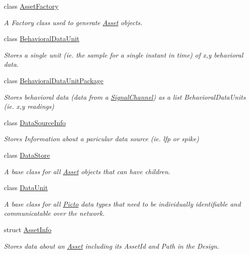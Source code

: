 \begin{DoxyCompactItemize}
class \hyperlink{class_picto_1_1_asset_factory}{Asset\-Factory}
\begin{DoxyCompactList}\small\item\em A Factory class used to generate \hyperlink{class_picto_1_1_asset}{Asset} objects. \end{DoxyCompactList}\item 
class \hyperlink{class_picto_1_1_behavioral_data_unit}{Behavioral\-Data\-Unit}
\begin{DoxyCompactList}\small\item\em Stores a single unit (ie. the sample for a single instant in time) of x,y behavioral data. \end{DoxyCompactList}\item 
class \hyperlink{class_picto_1_1_behavioral_data_unit_package}{Behavioral\-Data\-Unit\-Package}
\begin{DoxyCompactList}\small\item\em Stores behavioral data (data from a \hyperlink{class_picto_1_1_signal_channel}{Signal\-Channel}) as a list Behavioral\-Data\-Units (ie. x,y readings) \end{DoxyCompactList}\item 
class \hyperlink{class_picto_1_1_data_source_info}{Data\-Source\-Info}
\begin{DoxyCompactList}\small\item\em Stores Information about a paricular data source (ie. lfp or spike) \end{DoxyCompactList}\item 
class \hyperlink{class_picto_1_1_data_store}{Data\-Store}
\begin{DoxyCompactList}\small\item\em A base class for all \hyperlink{class_picto_1_1_asset}{Asset} objects that can have children. \end{DoxyCompactList}\item 
class \hyperlink{class_picto_1_1_data_unit}{Data\-Unit}
\begin{DoxyCompactList}\small\item\em A base class for all \hyperlink{namespace_picto}{Picto} data types that need to be individually identifiable and communicatable over the network. \end{DoxyCompactList}\item 
struct \hyperlink{struct_picto_1_1_asset_info}{Asset\-Info}
\begin{DoxyCompactList}\small\item\em Stores data about an \hyperlink{class_picto_1_1_asset}{Asset} including its Asset\-Id and Path in the Design. \end{DoxyCompactList}\item 

\end{DoxyCompactItemize}
